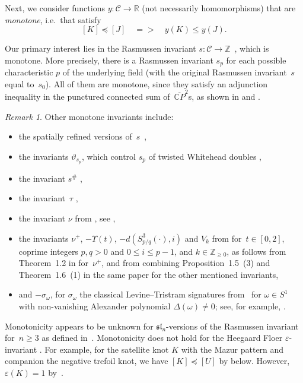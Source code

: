 \documentclass{amsart}
\let\cref\Cref
\newcommand{\Z}{\mathbb{Z}}
\newcommand{\CC}{\mathcal{C}}
\theoremstyle{remark}
\newtheorem{remark}[theorem]{Remark}
\def\Rightarrow{=>}
\begin{document}
Next, we consider functions $y\colon \CC\to\mathbb{R}$ (not necessarily homomorphisms) that are \emph{monotone}, i.e.~that satisfy 
\begin{equation}\label{eq:ypreserves}
[K] \preceq [J] \quad \Rightarrow \quad y(K) \leq y(J).
\end{equation}

Our primary interest lies in the Rasmussen invariant $s\colon \CC\to\mathbb{Z}$~\cite{rasmussen}, which is monotone. More precisely, there is a Rasmussen invariant $s_p$ for each possible characteristic $p$ of the underlying field (with the original Rasmussen invariant~$s$ equal to~$s_0$). All of them are monotone, since they satisfy an adjunction inequality in the punctured connected sum of~$\overline{\mathbb{C}P}^2$s, as shown in \cite[Corollary~1.9 and Theorem~1.11]{manolescu-marengon-sarkar-willis} and \cite[Corollaries 1.4 and~1.5]{ren:lee_torus_links}.

\begin{remark}
Other monotone invariants include:
\begin{itemize}
\item the spatially refined versions of~$s$~\cite{ren2025adjunctioninequalityspatiallyrefined},
\item the invariants $\vartheta_{s_p}$, which control $s_p$ of twisted Whitehead doubles \cite[Prop.~2.34]{zbMATH07939044},
\item the invariant $s^{\#}$ \cite{zbMATH06272212},
\item the invariant~$\tau$ \cite[Theorem~1.1]{zbMATH02057402},
\item the invariant $\nu$ from \cite{os:rational_surgeries}, see \cite[Theorem~4.7]{zbMATH07408046},
\item the invariants $\nu^+$, $-\Upsilon(t)$, $-d(S^3_{p/q}(\cdot),i)$ and $V_k$ from \cite{hom_wu,os:conc_homos,os:d_inv,rasmussen:hi,ni-wu} for~$t\in[0,2]$, coprime integers $p,q > 0$ and $0 \leq i \leq p-1$, and $k \in \Z_{\geq 0}$, as 
follows from Theorem~1.2 in \cite{SATO2018113} for~$\nu^+$, and from combining Proposition~1.5~(3) and Theorem~1.6~(1) in the same paper for the other mentioned invariants,
\item and $-\sigma_\omega$, for $\sigma_\omega$ the classical Levine--Tristram signatures from~\cite{Levine1969,tristram_1969} for $\omega \in S^1$ with non-vanishing Alexander polynomial $\Delta(\omega) \neq 0$; see, for example, \cite[Theorem~3.16]{zbMATH04096384}.
\end{itemize}
Monotonicity appears to be unknown for $\mathfrak{sl}_n$-versions of the Rasmussen invariant for~$n\geq 3$ as defined in~\cite{zbMATH05614872,zbMATH05550658}.
Monotonicity does not hold for the Heegaard Floer $\varepsilon$-invariant \cite{zbMATH06366498}. For example, for the satellite knot $K$ with the Mazur pattern and companion the negative trefoil knot, we have $[K] \preceq [U]$ by \cref{lem:monotonesattelite} below. However, $\varepsilon(K) = 1$ by~\cite{zbMATH06700148}.
\end{remark}
\end{document}

